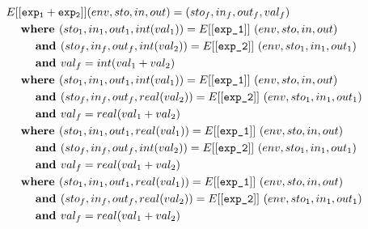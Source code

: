 \documentclass[12pt]{article}
\newcommand\eb[1]{[[\texttt{#1}]]}
\begin{document}
\begin{align*}
&E[[{\tt exp_1 + exp_2}]] (env,sto,in,out) = (sto_f,in_f,out_f,val_f)\\
&\hspace{3ex}\textbf{where } (sto_1,in_1,out_1,int(val_1)) = E\eb{exp\_1}\ (env,sto,in,out) \\
&\hspace{6ex}\textbf{and } (sto_f,in_f,out_f,int(val_2)) = E\eb{exp\_2}\ (env,sto_1,in_1,out_1) \\
&\hspace{6ex}\textbf{and } val_f = int(val_1 + val_2) \\
&\hspace{3ex}\textbf{where } (sto_1,in_1,out_1,int(val_1)) = E\eb{exp\_1}\ (env,sto,in,out) \\
&\hspace{6ex}\textbf{and } (sto_f,in_f,out_f,real(val_2)) = E\eb{exp\_2}\ (env,sto_1,in_1,out_1) \\
&\hspace{6ex}\textbf{and } val_f = real(val_1 + val_2) \\
&\hspace{3ex}\textbf{where } (sto_1,in_1,out_1,real(val_1)) = E\eb{exp\_1}\ (env,sto,in,out) \\
&\hspace{6ex}\textbf{and } (sto_f,in_f,out_f,int(val_2)) = E\eb{exp\_2}\ (env,sto_1,in_1,out_1) \\
&\hspace{6ex}\textbf{and } val_f = real(val_1 + val_2) \\
&\hspace{3ex}\textbf{where } (sto_1,in_1,out_1,real(val_1)) = E\eb{exp\_1}\ (env,sto,in,out) \\
&\hspace{6ex}\textbf{and } (sto_f,in_f,out_f,real(val_2)) = E\eb{exp\_2}\ (env,sto_1,in_1,out_1) \\
&\hspace{6ex}\textbf{and } val_f = real(val_1 + val_2) \\
\end{align*}
\end{document}
